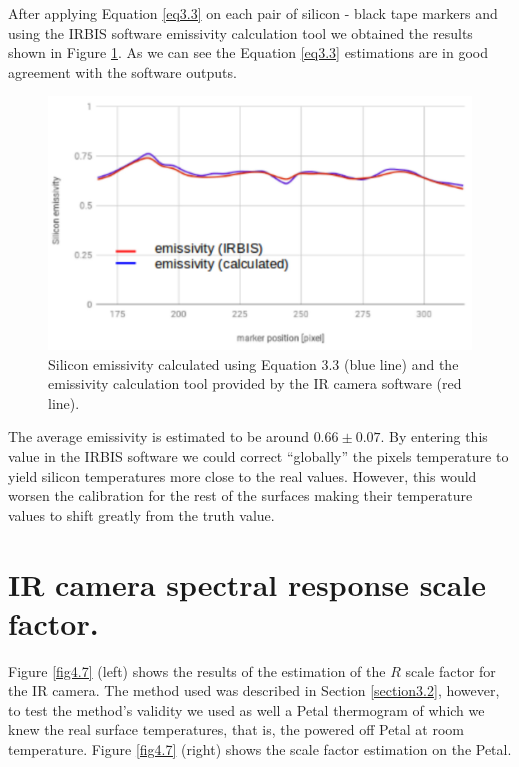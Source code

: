 		After applying Equation \ref{eq3.3} on each pair of silicon - black tape markers and using the IRBIS software emissivity calculation tool we obtained the results shown in Figure \ref{fig4.6}. As we can see the Equation \ref{eq3.3} estimations are in good agreement with the software outputs. 
	
		\begin{figure}[ht!]
			\centering
			\captionsetup{justification=centering,margin=2cm}
			\includegraphics[scale=0.35]{Figures/Chapter04/SiliconEmissivityCalculatedVSIRBIS.jpg}
			\caption{Silicon emissivity calculated using Equation 3.3 (blue line) and the emissivity calculation tool provided by the IR camera software (red line).}\label{fig4.6}
		\end{figure}
		
		The average emissivity is estimated to be around $0.66 \pm 0.07$. By entering this value in the IRBIS software we could correct “globally” the pixels temperature to yield silicon temperatures more close to the real values. However, this would worsen the calibration for the rest of the surfaces making their temperature values to shift greatly from the truth value.\bigskip
		
	\section{IR camera spectral response scale factor.}\label{section4.4}
	
		Figure \ref{fig4.7} (left) shows the results of the estimation of the $R$ scale factor for the IR camera. The method used was described in Section \ref{section3.2}, however, to test the method’s validity we used as well a Petal thermogram of which we knew the real surface temperatures, that is, the powered off Petal at room temperature. Figure \ref{fig4.7} (right) shows the scale factor estimation on the Petal.
		
